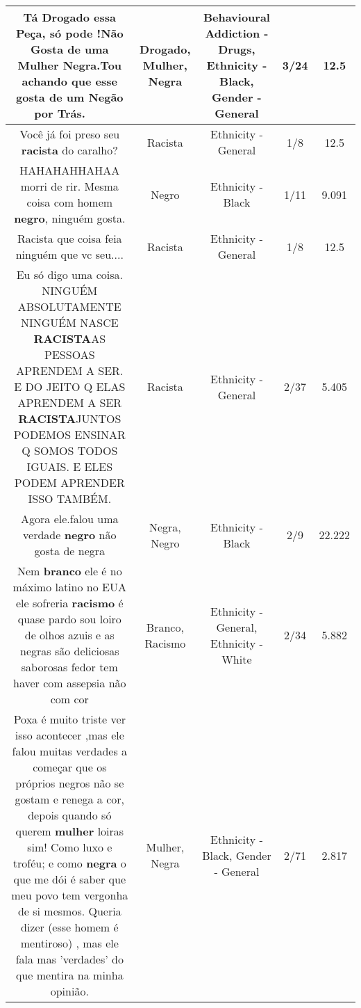\documentclass[11pt]{article}
\newlength\mylength
\begin{document}
\begin{center}
\begin{longtable}{|C{.65\mylength}|C{.30\mylength}|C{.12\mylength}|C{.12\mylength}|C{.12\mylength}|}
  \small Tá \textbf{Drogado} essa Peça, só pode !Não Gosta de uma \textbf{Mulher} \textbf{Negra}.Tou achando que esse gosta de um Negão por Trás. 🤣🤣🤣🤣🤣\normalsize   & Drogado, Mulher, Negra & Behavioural Addiction - Drugs, Ethnicity - Black, Gender - General & 3/24 & 12.5 \\  \hline
  \small Você já foi preso seu \textbf{racista} do caralho?\normalsize   & Racista & Ethnicity - General & 1/8 & 12.5 \\  \hline
  \small HAHAHAHHAHAA morri de rir. Mesma coisa com homem \textbf{negro}, ninguém gosta.\normalsize   & Negro & Ethnicity - Black & 1/11 & 9.091 \\  \hline
  \small Racista que coisa feia ninguém que vc seu....\normalsize   & Racista & Ethnicity - General & 1/8 & 12.5 \\  \hline
  \small Eu só digo uma coisa. NINGUÉM ABSOLUTAMENTE NINGUÉM NASCE \textbf{RACISTA}AS PESSOAS APRENDEM A SER. E DO JEITO Q ELAS APRENDEM A SER \textbf{RACISTA}JUNTOS PODEMOS ENSINAR Q SOMOS TODOS IGUAIS. E ELES PODEM APRENDER ISSO TAMBÉM.\normalsize   & Racista & Ethnicity - General & 2/37 & 5.405 \\  \hline
  \small Agora ele.falou uma verdade \textbf{negro} não gosta de negra\normalsize   & Negra, Negro & Ethnicity - Black & 2/9 & 22.222 \\  \hline
  \small Nem \textbf{branco} ele é no máximo latino no EUA ele sofreria \textbf{racismo} é quase pardo sou loiro de olhos azuis e as negras são deliciosas saborosas fedor tem haver com assepsia não com cor\normalsize   & Branco, Racismo & Ethnicity - General, Ethnicity - White & 2/34 & 5.882 \\  \hline
  \small Poxa é muito triste ver isso acontecer ,mas ele falou muitas verdades a começar que os próprios negros  não se gostam e renega a cor, depois quando só querem \textbf{mulher} loiras sim! Como luxo e troféu; e como \textbf{negra} o que me dói é saber que meu povo tem vergonha de si mesmos. Queria dizer (esse homem é mentiroso) , mas ele fala mas 'verdades' do que mentira na minha opinião.\normalsize   & Mulher, Negra & Ethnicity - Black, Gender - General & 2/71 & 2.817 \\  \hline

\end{longtable}
\end{center}
\end{document}

